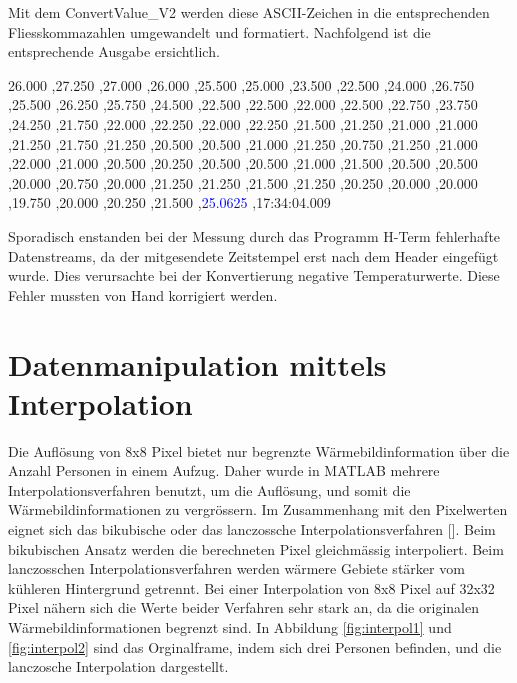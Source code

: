 Mit dem ConvertValue\_V2 werden diese \ac{ASCII}-Zeichen in die entsprechenden Fliesskommazahlen umgewandelt und formatiert. Nachfolgend ist die entsprechende Ausgabe ersichtlich.

26.000 ,27.250 ,27.000 ,26.000 ,25.500 ,25.000 ,23.500 ,22.500 ,24.000 ,26.750 ,25.500 ,26.250 ,25.750 ,24.500 ,22.500 ,22.500 ,22.000 ,22.500 ,22.750 ,23.750 ,24.250 ,21.750 ,22.000 ,22.250 ,22.000 ,22.250 ,21.500 ,21.250 ,21.000 ,21.000 ,21.250 ,21.750 ,21.250 ,20.500 ,20.500 ,21.000 ,21.250 ,20.750 ,21.250 ,21.000 ,22.000 ,21.000 ,20.500 ,20.250 ,20.500 ,20.500 ,21.000 ,21.500 ,20.500 ,20.500 ,20.000 ,20.750 ,20.000 ,21.250 ,21.250 ,21.500 ,21.250 ,20.250 ,20.000 ,20.000 ,19.750 ,20.000 ,20.250 ,21.500 ,\textcolor{blue}{25.0625} ,17:34:04.009

Sporadisch enstanden bei der Messung durch das Programm H-Term fehlerhafte Datenstreams, da der mitgesendete Zeitstempel erst nach dem Header eingefügt wurde. Dies verursachte bei der Konvertierung negative Temperaturwerte.  Diese Fehler mussten von Hand korrigiert werden. 


\section{Datenmanipulation mittels Interpolation}
\label{sec:Datenmanipulation}

Die Auflösung von 8x8 Pixel bietet nur begrenzte Wärmebildinformation über die Anzahl Personen in einem Aufzug. Daher wurde in MATLAB mehrere Interpolationsverfahren benutzt, um die Auflösung, und somit die Wärmebildinformationen zu vergrössern. Im Zusammenhang mit den Pixelwerten eignet sich das bikubische oder das lanczossche Interpolationsverfahren [\protect\cite{Interpol}]. Beim bikubischen Ansatz werden die berechneten Pixel gleichmässig interpoliert. Beim lanczosschen Interpolationsverfahren werden wärmere Gebiete stärker vom kühleren Hintergrund getrennt. Bei einer Interpolation von 8x8 Pixel auf 32x32 Pixel nähern sich die Werte beider Verfahren sehr stark an, da die originalen Wärmebildinformationen begrenzt sind. In Abbildung \ref{fig:interpol1} und \ref{fig:interpol2} sind das Orginalframe, indem sich drei Personen befinden, und die lanczosche Interpolation dargestellt.


